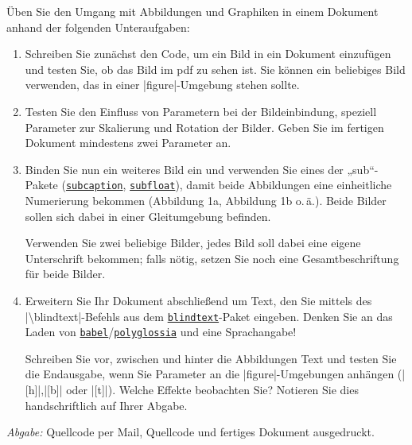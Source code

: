 \documentclass{scrartcl}
\newcommand{\abgabe}[1]{\par\noindent\textit{Abgabe:} #1}
\newcommand{\pkg}[1]{\href{http://ctan.org/pkg/#1}{\texttt{#1}}}
\begin{document}
\begin{question}[subtitle=Abbildungen]{6}
Üben Sie den Umgang mit Abbildungen und Graphiken in einem Dokument anhand der folgenden Unteraufgaben:
	\begin{enumerate}[label=\alph*)]
		\item Schreiben Sie zunächst den Code, um ein Bild in ein Dokument einzufügen und testen Sie, ob das Bild im pdf zu sehen ist. Sie können ein beliebiges Bild verwenden, das in einer |figure|-Umgebung stehen sollte.
		\item Testen Sie den Einfluss von Parametern bei der Bildeinbindung, speziell Parameter zur Skalierung und Rotation der Bilder. Geben Sie im fertigen Dokument mindestens zwei Parameter an.
		\item Binden Sie nun ein weiteres Bild ein und verwenden Sie eines der „sub“-Pakete (\pkg{subcaption}, \pkg{subfloat}), damit beide Abbildungen eine einheitliche Numerierung bekommen (Abbildung 1a, Abbildung 1b o.\,ä.). Beide Bilder sollen sich dabei in einer Gleitumgebung befinden.
		
		Verwenden Sie zwei beliebige Bilder, jedes Bild soll dabei eine eigene Unterschrift bekommen; falls nötig, setzen Sie noch eine Gesamtbeschriftung für beide Bilder.
		\item Erweitern Sie Ihr Dokument abschließend um Text, den Sie mittels des |\textbackslash blindtext|-Befehls aus dem \pkg{blindtext}-Paket eingeben. Denken Sie an das Laden von \pkg{babel}/\pkg{polyglossia} und eine Sprachangabe!

		Schreiben Sie vor, zwischen und hinter die Abbildungen Text und testen Sie die Endausgabe, wenn Sie Parameter an die |figure|-Umgebungen anhängen (|[h]|,|[b]| oder |[t]|). Welche Effekte beobachten Sie? Notieren Sie dies handschriftlich auf Ihrer Abgabe.
\end{enumerate}
	\abgabe{Quellcode per Mail{,} Quellcode und fertiges Dokument ausgedruckt.}
\end{question}
 
\end{document}
